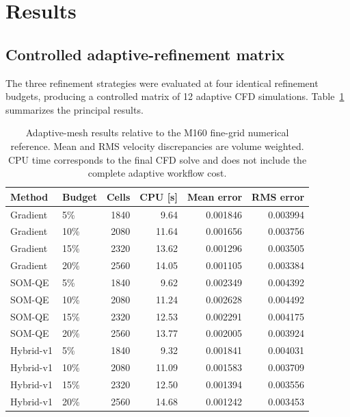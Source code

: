 \section{Results}
\label{sec:results}

\subsection{Controlled adaptive-refinement matrix}

The three refinement strategies were evaluated at four identical refinement
budgets, producing a controlled matrix of 12 adaptive CFD simulations.
Table~\ref{tab:adaptive_results} summarizes the principal results.

\begin{table}[htbp]
\centering
\caption{Adaptive-mesh results relative to the M160 fine-grid numerical
reference. Mean and RMS velocity discrepancies are volume weighted. CPU time
corresponds to the final CFD solve and does not include the complete adaptive
workflow cost.}
\label{tab:adaptive_results}
\small
\begin{tabular}{llrrrr}
\toprule
Method & Budget & Cells & CPU [s] & Mean error & RMS error \\
\midrule
Gradient & 5\%  & 1840 & 9.64  & 0.001846 & 0.003994 \\
Gradient & 10\% & 2080 & 11.64 & 0.001656 & 0.003756 \\
Gradient & 15\% & 2320 & 13.62 & 0.001296 & 0.003505 \\
Gradient & 20\% & 2560 & 14.05 & 0.001105 & 0.003384 \\
\midrule
SOM-QE & 5\%  & 1840 & 9.62  & 0.002349 & 0.004392 \\
SOM-QE & 10\% & 2080 & 11.24 & 0.002628 & 0.004492 \\
SOM-QE & 15\% & 2320 & 12.53 & 0.002291 & 0.004175 \\
SOM-QE & 20\% & 2560 & 13.77 & 0.002005 & 0.003924 \\
\midrule
Hybrid-v1 & 5\%  & 1840 & 9.32  & 0.001841 & 0.004031 \\
Hybrid-v1 & 10\% & 2080 & 11.09 & 0.001583 & 0.003709 \\
Hybrid-v1 & 15\% & 2320 & 12.50 & 0.001394 & 0.003556 \\
Hybrid-v1 & 20\% & 2560 & 14.68 & 0.001242 & 0.003453 \\
\bottomrule
\end{tabular}
\end{table}

